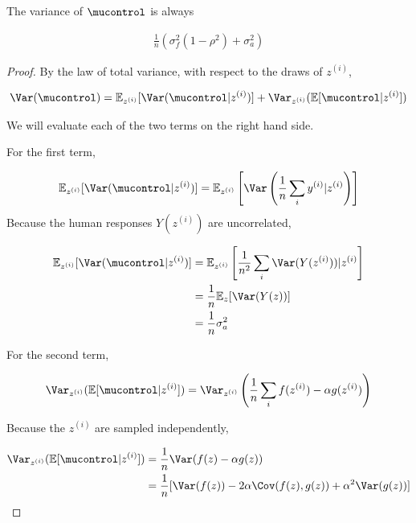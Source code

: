 \begin{lemma}
\label{lem:variance_calc}
The variance of $\mucontrol$ is always

\begin{align}
\frac{1}{n}(\sigma^2_f (1-\rho^2) + \sigma^2_a)
\end{align}

\end{lemma}
\begin{proof}
By the law of total variance, with respect to the draws of $z^{(i)}$,

\begin{align}
\Var(\mucontrol) = \mathbb{E}_{z^{(i)}}[\Var(\mucontrol | z^{(i)})] + \Var_{z^{(i)}} ( \mathbb{E}[\mucontrol | z^{(i)} ] ) 
\end{align}

We will evaluate each of the two terms on the right hand side. 

For the first term,

\begin{align}
\mathbb{E}_{z^{(i)}}[\Var(\mucontrol | z^{(i)})] = \mathbb{E}_{z^{(i)}} \left[ \Var \left( \frac{1}{n} \sum_i y^{(i)} | z^{(i)} \right) \right]
\end{align}
Because the human responses $Y(z^{(i)})$ are uncorrelated,

\begin{align}
\mathbb{E}_{z^{(i)}}[\Var(\mucontrol | z^{(i)})] &= \mathbb{E}_{z^{(i)}} \left[ \frac{1}{n^2} \sum_i \Var( Y(z^{(i)}) ) | z^{(i)} \right] \\
&= \frac{1}{n} \mathbb{E}_z [\Var(Y(z))] \\
&= \frac{1}{n} \sigma^2_a
\end{align}

For the second term,

\begin{align}
\Var_{z^{(i)}}( \mathbb{E}[\mucontrol | z^{(i)}]) = \Var_{z^{(i)}} \left( \frac{1}{n} \sum_i f(z^{(i)}) - \alpha g(z^{(i)}) \right)
\end{align}

Because the $z^{(i)}$ are sampled independently,

\begin{align}
\Var_{z^{(i)}}( \mathbb{E}[\mucontrol | z^{(i)}]) &= \frac{1}{n} \Var( f(z) - \alpha g(z)) \\
&= \frac{1}{n} [\Var(f(z)) - 2 \alpha \Cov(f(z),g(z)) + \alpha^2 \Var(g(z))]
\end{align}


\end{proof}
